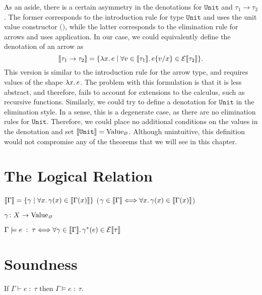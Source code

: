 As an aside, there is a certain asymmetry in the denotations for
$\texttt{Unit}$ and $\tau_1\to\tau_2$. The former corresponds to the
introduction rule for type $\texttt{Unit}$ and uses the unit value constructor
$\texttt{()}$, while the latter corresponds to the elimination rule for
arrows and uses application.
In our case, we could equivalently define the denotation of an arrow as
\[
  \llbracket\tau_1 \to \tau_2\rrbracket = \{ \lambda x\ldotp e \mid
  \forall v \in \llbracket\tau_1\rrbracket\ldotp
    e\{v/x\} \in \mathcal{E}\llbracket\tau_2\rrbracket \}.
\]
This version is similar to the introduction rule for the arrow type, and
requires values of the shape $\lambda x\ldotp e$. The problem with this
formulation is that it is less abstract, and therefore, fails to account for
extensions to the calculus, such as recursive functions. Similarly, we could
try to define a denotation for $\texttt{Unit}$ in the elimination style.
In a sense, this is a degenerate case, as there are no elimination rules for
$\texttt{Unit}$. Therefore, we could place no additional conditions on the
values in the denotation and set
$\llbracket\texttt{Unit}\rrbracket = \mathrm{Value}_{\varnothing}$. Although
unintuitive, this definition would not compromise any of the theorems
that we will see in this chapter.

\section{The Logical Relation}


$\llbracket\Gamma\rrbracket = \{\gamma \mid \forall x\ldotp \gamma(x) \in \llbracket\Gamma(x)\rrbracket\}$
($\gamma \in \llbracket\Gamma\rrbracket \Longleftrightarrow \forall x\ldotp \gamma(x) \in \llbracket\Gamma(x)\rrbracket $)

$\gamma \colon X \to \mathrm{Value}_{\varnothing}$

$\Gamma \models e \;:\; \tau \Longleftrightarrow
  \forall \gamma \in \llbracket\Gamma\rrbracket\ldotp
  \gamma^*(e) \in \mathcal{E}\llbracket\tau\rrbracket$

\section{Soundness}

\begin{theorem}
  If $\Gamma \vdash e \;:\; \tau$ then $\Gamma \models e \;:\; \tau$.
\end{theorem}

